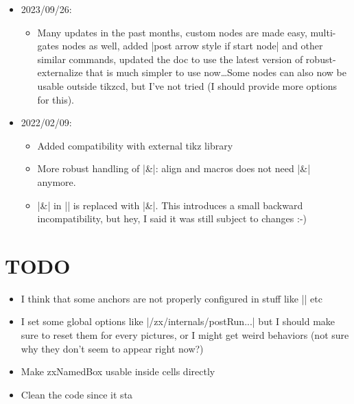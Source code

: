 \documentclass[a4paper,doc2]{ltxdoc} %
\begin{document}
\begin{itemize}
\item 2023/09/26:
  \begin{itemize}
  \item Many updates in the past months, custom nodes are made easy, multi-gates nodes as well, added |post arrow style if start node| and other similar commands, updated the doc to use the latest version of robust-externalize that is much simpler to use now\dots Some nodes can also now be usable outside tikzcd, but I've not tried (I should provide more options for this).
  \end{itemize}
\item 2022/02/09:
  \begin{itemize}
  \item Added compatibility with external tikz library
  \item More robust handling of |&|: align and macros does not need |\&| anymore.
  \item |\&| in |\zxSaveDiagram| is replaced with |&|. This introduces a small backward incompatibility, but hey, I said it was still subject to changes :-)
  \end{itemize}
\end{itemize}

\section{TODO}
\begin{itemize}
\item I think that some anchors are not properly configured in stuff like |\zxBox| etc
\item I set some global options like |/zx/internals/postRun...| but I should make sure to reset them for every pictures, or I might get weird behaviors (not sure why they don't seem to appear right now?)
\item Make zxNamedBox usable inside cells directly
\item Clean the code since it sta
\end{itemize}

\printindex

\printbibliography[heading=bibintoc]
\end{document}
